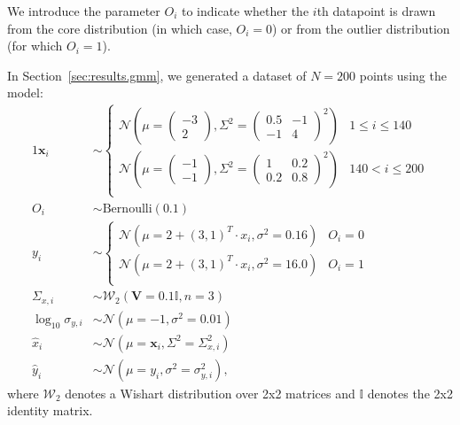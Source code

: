 \documentclass[fleqn,usenatbib]{rasti}
\begin{document}
We introduce the parameter $O_i$ to indicate whether the $i$th datapoint is
drawn from the core distribution (in which case, $O_i = 0$) or from the outlier
distribution (for which $O_i = 1$).

In Section~\ref{sec:results.gmm}, we generated a dataset of $N = 200$ points
using the model:
\begin{alignat}{1}
    \boldsymbol{x}_i& \sim
    \begin{cases}
        \mathcal N \left(
            \mu = \begin{pmatrix} -3 \\ 2 \end{pmatrix},
            \Sigma^2 = \begin{pmatrix} 0.5 & -1 \\ -1 & 4 \end{pmatrix}^2
        \right) &
            1 \leqslant i \leqslant 140 \\
        \mathcal N \left(
            \mu = \begin{pmatrix} -1 \\ -1 \end{pmatrix},
            \Sigma^2 = \begin{pmatrix} 1 & 0.2 \\ 0.2 & 0.8 \end{pmatrix}^2
        \right) &
            140 < i \leqslant 200 \\
    \end{cases}\\
    O_i& \sim \mathrm{Bernoulli}(0.1) \\
    y_i& \sim
    \begin{cases}
        \mathcal N (\mu = 2 + (3, 1)^T \cdot x_i, \sigma^2 = 0.16) &
            O_i = 0 \\
        \mathcal N (\mu = 2 + (3, 1)^T \cdot x_i, \sigma^2 = 16.0) &
            O_i = 1 \\
    \end{cases}\\
    \Sigma_{x, i}& \sim \mathcal W_2 (\boldsymbol{V} = 0.1 \mathbb{I}, n = 3) \\
    \log_{10} \sigma_{y, i}& \sim \mathcal N (\mu = -1, \sigma^2 = 0.01) \\
    \hat{x}_i& \sim
        \mathcal N (\mu = \boldsymbol{x}_i, \Sigma^2 = \Sigma_{x, i}^2) \\
    \hat{y}_i& \sim \mathcal N (\mu = y_i, \sigma^2 = \sigma_{y, i}^2),
\end{alignat}
where $\mathcal W_2$ denotes a Wishart distribution over 2x2 matrices and
$\mathbb{I}$ denotes the 2x2 identity matrix.
\end{document}
